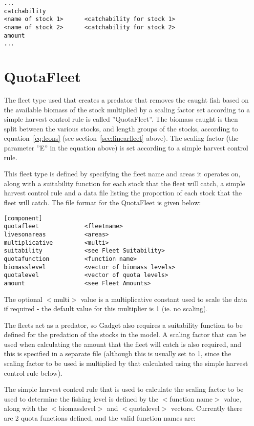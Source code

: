 \documentclass[10pt,twoside]{book}
\begin{document}
{\small\begin{verbatim}
...
catchability
<name of stock 1>      <catchability for stock 1>
<name of stock 2>      <catchability for stock 2>
amount
...
\end{verbatim}}

\section{QuotaFleet}\label{sec:quotafleet}
The fleet type used that creates a predator that removes the caught fish based on the available biomass of the stock multiplied by a scaling factor set according to a simple harvest control rule is called ''QuotaFleet''.  The biomass caught is then split between the various stocks, and length groups of the stocks, according to equation~\ref{eq:lcons} (see section~\ref{sec:linearfleet} above).  The scaling factor (the parameter ''E'' in the equation above) is set according to a simple harvest control rule.

\bigskip
This fleet type is defined by specifying the fleet name and areas it operates on, along with a suitability function for each stock that the fleet will catch, a simple harvest control rule and a data file listing the proportion of each stock that the fleet will catch.  The file format for the QuotaFleet is given below:

{\small\begin{verbatim}
[component]
quotafleet             <fleetname>
livesonareas           <areas>
multiplicative         <multi>
suitability            <see Fleet Suitability>
quotafunction          <function name>
biomasslevel           <vector of biomass levels>
quotalevel             <vector of quota levels>
amount                 <see Fleet Amounts>
\end{verbatim}}

The optional $<$multi$>$ value is a multiplicative constant used to scale the data if required - the default value for this multiplier is 1 (ie. no scaling).

\bigskip
The fleets act as a predator, so Gadget also requires a suitability function to be defined for the predation of the stocks in the model.  A scaling factor that can be used when calculating the amount that the fleet will catch is also required, and this is specified in a separate file (although this is usually set to 1, since the scaling factor to be used is multiplied by that calculated using the simple harvest control rule below).

\bigskip
The simple harvest control rule that is used to calculate the scaling factor to be used to determine the fishing level is defined by the $<$function name$>$ value, along with the $<$biomasslevel$>$ and $<$quotalevel$>$ vectors.  Currently there are 2 quota functions defined, and the valid function names are:
\end{document}
